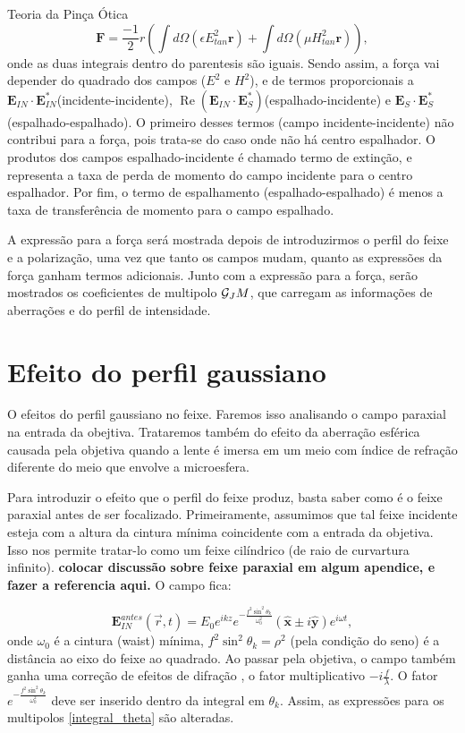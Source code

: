 \begin{chapter}{Teoria da Pinça Ótica}
\begin{equation}
{\mathbf F}=\frac{-1}{2}r\left( \int d\Omega (\epsilon E^2_{tan}{\mathbf r}) + \int d\Omega (\mu H^2_{tan}{\mathbf r}) \right),
\end{equation}
%
onde as duas integrais dentro do parentesis são iguais. Sendo assim, a força vai depender do quadrado dos campos ($E^2$ e $H^2$), e de termos proporcionais a ${\mathbf E}_{IN}\cdot{\mathbf E}_{IN}^*$(incidente-incidente), $\operatorname{Re}({\mathbf E}_{IN}\cdot{\mathbf E}_S^*)$(espalhado-incidente) e ${\mathbf E}_S\cdot{\mathbf E}_S^*$(espalhado-espalhado). O primeiro desses termos (campo incidente-incidente) não contribui para a força, pois trata-se do caso onde não há centro espalhador. O produtos dos campos espalhado-incidente é chamado termo de extinção, e representa a taxa de perda de momento do campo incidente para o centro espalhador. Por fim, o termo de espalhamento (espalhado-espalhado) é menos a taxa de transferência de momento para o campo espalhado.

A expressão para a força será mostrada depois de introduzirmos o perfil do feixe e a polarização, uma vez que tanto os campos mudam, quanto as expressões da força ganham termos adicionais. Junto com a expressão para a força, serão mostrados os coeficientes de multipolo $\mathcal G_JM$, que carregam as informações de aberrações e do perfil de intensidade.

%
%
%
%
\section{Efeito do perfil gaussiano}

\hspace{5 mm}O efeitos do perfil gaussiano no feixe. Faremos isso analisando o campo paraxial na entrada da obejtiva. Trataremos também do efeito da aberração esférica causada pela objetiva quando a lente é imersa em um meio com índice de refração diferente do meio que envolve a microesfera. 

Para introduzir o efeito que o perfil do feixe produz, basta saber como é o feixe paraxial antes de ser focalizado. Primeiramente, assumimos que tal feixe incidente esteja com a altura da cintura mínima coincidente com a entrada da objetiva. Isso nos permite tratar-lo como um feixe cilíndrico (de raio de curvartura infinito). {\bf colocar discussão sobre feixe paraxial em algum apendice, e fazer a referencia aqui.} O campo fica:

\begin{equation}
{\mathbf E}_{IN}^{antes}(\vec{r},t)=E_0 e^{ikz} e^{-\frac{f^2\sin^2\theta_k}{\omega_0^2}}(\hat{{\mathbf x}}\pm i\hat{{\mathbf y}}) e^{i\omega t},
\label{campo_ent}
\end{equation}
%
onde $\omega_0$ é a cintura (waist) mínima, $f^2\sin^2\theta_k=\rho^2$ (pela condição do seno) é a distância ao eixo do feixe ao quadrado. Ao passar pela objetiva, o campo também ganha uma correção de efeitos de difração \cite{1959a}, o fator multiplicativo $-i\frac{f}{\lambda}$. O fator $e^{-\frac{f^2\sin^2\theta_k}{\omega_0^2}}$ deve ser inserido dentro da integral em $\theta_k$. Assim, as expressões para os multipolos \ref{integral_theta} são alteradas.


\end{chapter}

